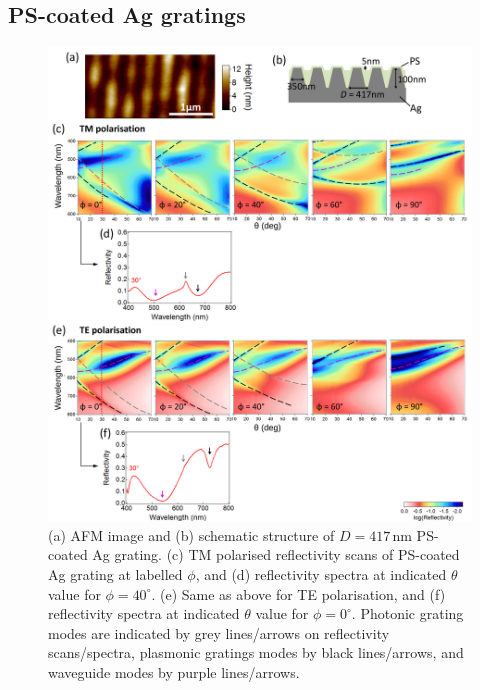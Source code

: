 \subsection{PS-coated Ag gratings}
\begin{figure}[h!] 
\centering    
\includegraphics[width=\textwidth]{Fig11}
\caption[(a) AFM image and (b) schematic structure of $D=417$\,nm PS-coated Ag grating. Reflectivity measurements of PS-coated Ag grating in (c,d) TM and (e.f) TE polarisation.]{(a) AFM image and (b) schematic structure of $D=417$\,nm PS-coated Ag grating. (c) TM polarised reflectivity scans of PS-coated Ag grating at labelled $\phi$, and (d) reflectivity spectra at indicated $\theta$ value for $\phi=40^{\circ}$. (e) Same as above for TE polarisation, and (f) reflectivity spectra at indicated $\theta$ value for $\phi=0^{\circ}$. Photonic grating modes are indicated by grey lines/arrows on reflectivity scans/spectra, plasmonic gratings modes by black lines/arrows, and waveguide modes by purple lines/arrows.}
\label{7Fig11}
\end{figure}
